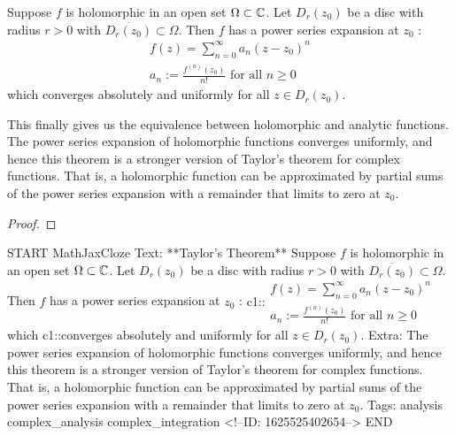 \documentclass{memoir}
\begin{document}

\begin{thm}
	Suppose \(f\) is holomorphic in an open set \(\Omega \subset \mathbb{C}\). Let \(D_r(z_0)\) be a disc with radius \(r>0\) with \(\overline{D_r(z_0)}\subset \Omega \). Then \(f\) has a power series expansion at \(z_0\) :
	\begin{align*}
		f(z) = \sum_{n=0}^{\infty} a_n(z-z_0)^{n}\\
		a_n := \frac{f^{(n)}(z_0)}{n!} \text{ for all } n\geq 0
	\end{align*}
	which converges absolutely and uniformly for all \(z \in D_r(z_0)\).
\end{thm}
This finally gives us the equivalence between holomorphic and analytic functions.\\

The power series expansion of holomorphic functions converges uniformly, and hence this theorem is a stronger version of Taylor's theorem for complex functions. That is, a holomorphic function can be approximated by partial sums of the power series expansion with a remainder that limits to zero at \(z_0\).

\begin{proof}
	
\end{proof}

\begin{anki}
START
MathJaxCloze
Text: **Taylor's Theorem**
Suppose \(f\) is holomorphic in an open set \(\Omega \subset \mathbb{C}\). Let \(D_r(z_0)\) be a disc with radius \(r>0\) with \(\overline{D_r(z_0)}\subset \Omega \). Then \(f\) has a power series expansion at \(z_0\) :
 {{c1::\(\begin{align*}
         	f(z) = \sum_{n=0}^{\infty} a_n(z-z_0)^{n}\\
         	a_n := \frac{f^{(n)}(z_0)}{n!} \text{ for all } n\geq 0
         \end{align*}\)}}
which {{c1::converges absolutely and uniformly}}  for all \(z \in D_r(z_0)\).
Extra: The power series expansion of holomorphic functions converges uniformly, and hence this theorem is a stronger version of Taylor's theorem for complex functions. That is, a holomorphic function can be approximated by partial sums of the power series expansion with a remainder that limits to zero at \(z_0\).
Tags: analysis complex_analysis complex_integration
<!--ID: 1625525402654-->
END
\end{anki}
\end{document}
